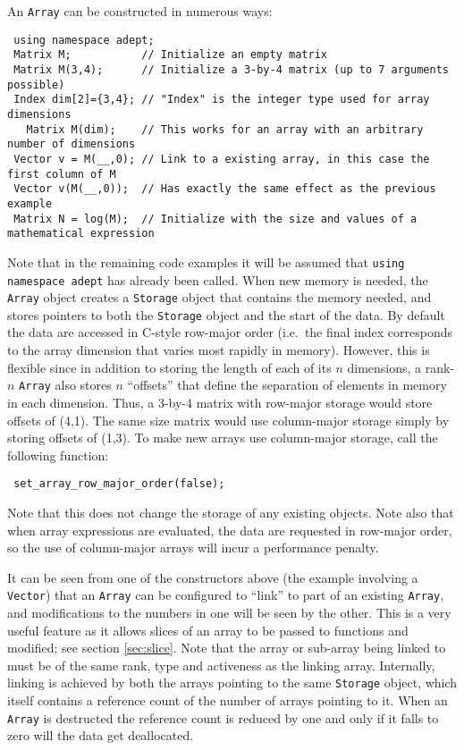 \documentclass[a4,oneside]{book}
\def\codesize{\small}
\def\code#1{{\codesize\texttt{#1}}}
\begin{document}
An \code{Array} can be constructed in numerous ways:
\begin{lstlisting}
 using namespace adept;
 Matrix M;           // Initialize an empty matrix
 Matrix M(3,4);      // Initialize a 3-by-4 matrix (up to 7 arguments possible)
 Index dim[2]={3,4}; // "Index" is the integer type used for array dimensions
   Matrix M(dim);    // This works for an array with an arbitrary number of dimensions
 Vector v = M(__,0); // Link to a existing array, in this case the first column of M
 Vector v(M(__,0));  // Has exactly the same effect as the previous example
 Matrix N = log(M);  // Initialize with the size and values of a mathematical expression
\end{lstlisting}
Note that in the remaining code examples it will be assumed that
\code{using namespace adept} has already been called.  When new memory
is needed, the \code{Array} object creates a \code{Storage} object
that contains the memory needed, and stores pointers to both the
\code{Storage} object and the start of the data. By default the data
are accessed in C-style row-major order (i.e.\ the final index
corresponds to the array dimension that varies most rapidly in
memory). However, this is flexible since in addition to storing the
length of each of its $n$ dimensions, a rank-$n$ \code{Array} also
stores $n$ ``offsets'' that define the separation of elements in
memory in each dimension. Thus, a 3-by-4 matrix with row-major storage
would store offsets of (4,1). The same size matrix would use
column-major storage simply by storing offsets of (1,3). To make new
arrays use column-major storage, call the following function:
\begin{lstlisting}
 set_array_row_major_order(false);
\end{lstlisting}
Note that this does not change the storage of any existing
objects. Note also that when array expressions are evaluated, the data
are requested in row-major order, so the use of column-major arrays
will incur a performance penalty.

It can be seen from one of the constructors above (the example
involving a \code{Vector}) that an \code{Array} can be configured to
``link'' to part of an existing \code{Array}, and modifications to the
numbers in one will be seen by the other. This is a very useful
feature as it allows slices of an array to be passed to functions and
modified; see section \ref{sec:slice}. Note that the array or
sub-array being linked to must be of the same rank, type and
activeness as the linking array.  Internally, linking is achieved by
both the arrays pointing to the same \code{Storage} object, which
itself contains a reference count of the number of arrays pointing to
it. When an \code{Array} is destructed the reference count is reduced
by one and only if it falls to zero will the data get deallocated.
\end{document}
